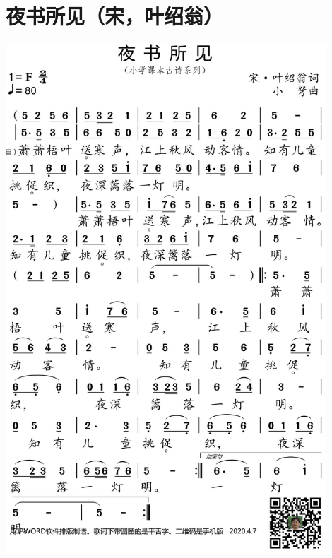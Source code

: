 \documentclass[cn,pad,chinesefont=nofont,twocol]{elegantbook}
\begin{document}
\section{夜书所见（宋，叶绍翁）}
    \includegraphics[width=0.9\textwidth]{dongxiao/20200627-古诗-夜书所见.jpg}   
\end{document}

